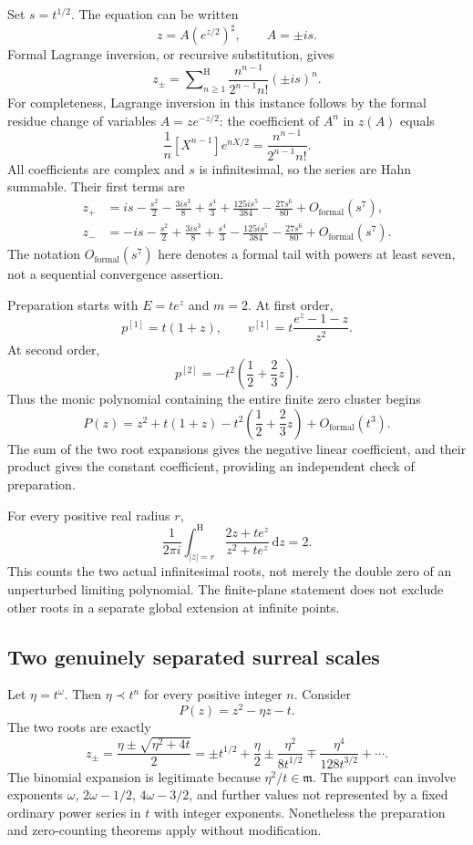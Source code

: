 \documentclass[11pt,oneside]{article}
\theoremstyle{definition}\newtheorem{definition}[theorem]{Definition}
\newcommand{\mm}{\mathfrak m}
\newcommand{\dd}{\,\mathrm d}
\newcommand{\Hsum}{\mathop{\sum}\nolimits^{\mathrm H}}
\newcommand{\htop}{\mathrm H}
\begin{document}
Set $s=t^{1/2}$. The equation can be written
\[
 z=A(e^{z/2})^\sharp,\qquad A=\pm is.
\]
Formal Lagrange inversion, or recursive substitution, gives
\begin{equation}\label{eq:rootseries}
 z_\pm=\Hsum_{n\geq1}
       \frac{n^{n-1}}{2^{n-1}n!}(\pm is)^n.
\end{equation}
For completeness, Lagrange inversion in this instance follows by the formal residue change of variables $A=ze^{-z/2}$: the coefficient of $A^n$ in $z(A)$ equals
\[
 \frac1n[X^{n-1}]e^{nX/2}
 =\frac{n^{n-1}}{2^{n-1}n!}.
\]
All coefficients are complex and $s$ is infinitesimal, so the series are Hahn summable. Their first terms are
\begin{align*}
 z_+&=is-\frac{s^2}{2}-\frac{3is^3}{8}
       +\frac{s^4}{3}+\frac{125is^5}{384}-\frac{27s^6}{80}
       +O_{\mathrm{formal}}(s^7),\\
 z_-&=-is-\frac{s^2}{2}+\frac{3is^3}{8}
       +\frac{s^4}{3}-\frac{125is^5}{384}-\frac{27s^6}{80}
       +O_{\mathrm{formal}}(s^7).
\end{align*}
The notation $O_{\mathrm{formal}}(s^7)$ here denotes a formal tail with powers at least seven, not a sequential convergence assertion.

Preparation starts with $E=te^z$ and $m=2$. At first order,
\[
 p^{[1]}=t(1+z),\qquad
 v^{[1]}=t\frac{e^z-1-z}{z^2}.
\]
At second order,
\[
 p^{[2]}=-t^2\left(\frac12+\frac23z\right).
\]
Thus the monic polynomial containing the entire finite zero cluster begins
\[
 P(z)=z^2+t(1+z)-t^2\left(\frac12+\frac23z\right)
       +O_{\mathrm{formal}}(t^3).
\]
The sum of the two root expansions gives the negative linear coefficient, and their product gives the constant coefficient, providing an independent check of preparation.

For every positive real radius $r$,
\[
 \frac1{2\pi i}\int_{|z|=r}^{\htop}
       \frac{2z+te^z}{z^2+te^z}\dd z=2.
\]
This counts the two actual infinitesimal roots, not merely the double zero of an unperturbed limiting polynomial. The finite-plane statement does not exclude other roots in a separate global extension at infinite points.

\subsection{Two genuinely separated surreal scales}
Let $\eta=t^\omega$. Then $\eta\prec t^n$ for every positive integer $n$. Consider
\[
 P(z)=z^2-\eta z-t.
\]
The two roots are exactly
\[
 z_\pm=\frac{\eta\pm\sqrt{\eta^2+4t}}2
 =\pm t^{1/2}+\frac\eta2
   \pm\frac{\eta^2}{8t^{1/2}}
   \mp\frac{\eta^4}{128t^{3/2}}+\cdots.
\]
The binomial expansion is legitimate because $\eta^2/t\in\mm$. The support can involve exponents $\omega$, $2\omega-1/2$, $4\omega-3/2$, and further values not represented by a fixed ordinary power series in $t$ with integer exponents. Nonetheless the preparation and zero-counting theorems apply without modification.
\end{document}
